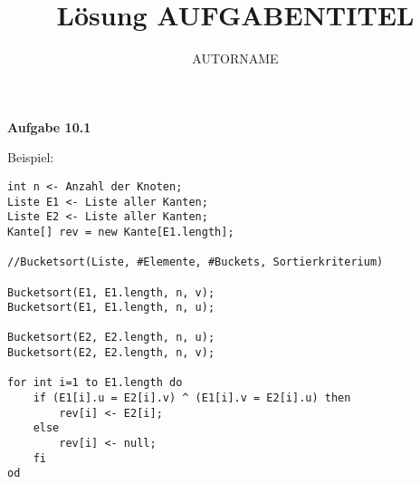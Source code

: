 \documentclass[12pt]{article}
\author{AUTORNAME}
\title{Lösung AUFGABENTITEL}
\begin{document}
\maketitle
\lstset{language=algopseudocode}

\textbf{Aufgabe 10.1}

Beispiel:

\begin{minipage}[c]{\textwidth}
\begin{lstlisting}[frame=single,title={Aufgabe 10.3}]
int n <- Anzahl der Knoten;
Liste E1 <- Liste aller Kanten;
Liste E2 <- Liste aller Kanten;
Kante[] rev = new Kante[E1.length];

//Bucketsort(Liste, #Elemente, #Buckets, Sortierkriterium)

Bucketsort(E1, E1.length, n, v);
Bucketsort(E1, E1.length, n, u);

Bucketsort(E2, E2.length, n, u);
Bucketsort(E2, E2.length, n, v);

for int i=1 to E1.length do
	if (E1[i].u = E2[i].v) ^ (E1[i].v = E2[i].u) then
		rev[i] <- E2[i];
	else
		rev[i] <- null;
	fi
od
\end{lstlisting}
\end{minipage}

\vspace{0.75cm}
\end{document}
